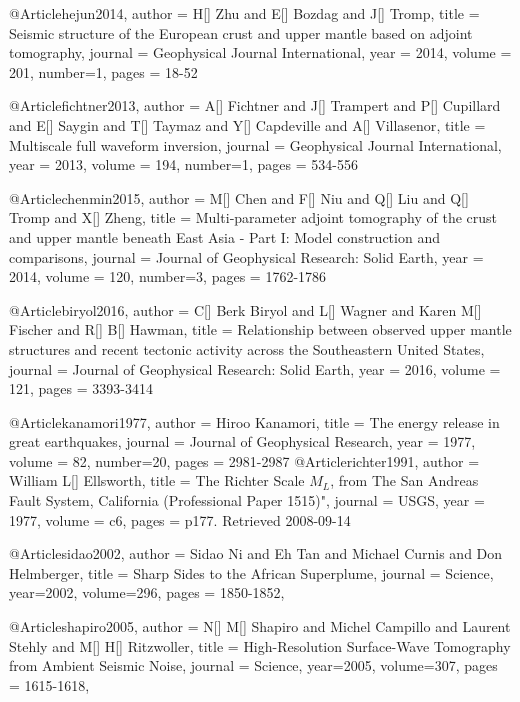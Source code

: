 @Article{hejun2014,
  author = 	 {H[] Zhu and E[] Bozdag and J[] Tromp},
  title = 	 {Seismic structure of the European crust and upper mantle based on adjoint tomography},
  journal = 	 {Geophysical Journal International},
  year = 	 2014,
  volume = 201,
  number=1,
  pages =	 {18-52}
}

@Article{fichtner2013,
  author = 	 {A[] Fichtner and J[] Trampert and P[] Cupillard and E[] Saygin and T[] Taymaz and Y[] Capdeville and A[] Villasenor},
  title = 	 {Multiscale full waveform inversion},
  journal = 	 {Geophysical Journal International},
  year = 	 2013,
  volume = 194,
  number=1,
  pages =	 {534-556}
}

@Article{chenmin2015,
  author = 	 {M[] Chen and F[] Niu and Q[] Liu and Q[] Tromp and X[] Zheng},
  title = 	 {Multi‐parameter adjoint tomography of the crust and upper mantle beneath {E}ast {A}sia - {P}art I: {M}odel construction and comparisons},
  journal = 	 {Journal of Geophysical Research: Solid Earth},
  year = 	 2014,
  volume = 120,
  number=3,
  pages =	 {1762-1786}
}


@Article{biryol2016,
  author = 	 {C[] Berk Biryol and L[] Wagner and Karen M[] Fischer and R[] B[] Hawman},
  title = 	 {Relationship between observed upper mantle structures and recent tectonic activity across the Southeastern United States},
  journal = 	 {Journal of Geophysical Research: Solid Earth},
  year = 	 2016,
  volume = 121,
  pages =	 {3393-3414}
}

@Article{kanamori1977,
  author = 	 {Hiroo Kanamori},
  title = 	 {The energy release in great earthquakes},
  journal = 	 {Journal of Geophysical Research},
  year = 	 1977,
  volume = 82,
  number=20,
  pages =	 {2981-2987}
}
@Article{richter1991,
  author = 	 {William L[] Ellsworth},
  title = 	 {The Richter Scale $M_L$, from The San Andreas Fault System, California (Professional Paper 1515)"},
  journal = 	 {USGS},
  year = 	 1977,
  volume = c6,
  pages =	 {p177. Retrieved 2008-09-14}
}



@Article{sidao2002,
  author =	 {Sidao Ni and Eh Tan and Michael Curnis and Don Helmberger},
  title =	 {Sharp Sides to the African Superplume},
  journal =	 {Science},
  year=2002,
  volume=296,
  pages =	 {1850-1852},
}

@Article{shapiro2005,
  author =	 {N[] M[] Shapiro and Michel Campillo and Laurent Stehly and M[] H[] Ritzwoller},
  title =	 {High-Resolution Surface-Wave Tomography from Ambient Seismic Noise},
  journal =	 {Science},
  year=2005,
  volume=307,
  pages =	 {1615-1618},
}

